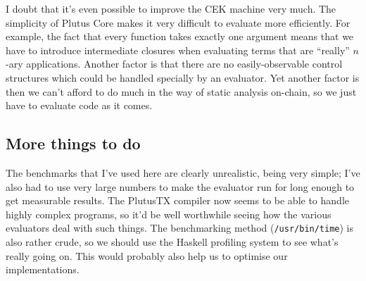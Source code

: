 \documentclass[a4paper]{article}
\begin{document}
I doubt that it's even possible to improve the CEK machine very much.
The simplicity of Plutus Core makes it very difficult to evaluate more
efficiently.  For example, the fact that every function takes exactly
one argument means that we have to introduce intermediate closures
when evaluating terms that are ``really'' $n$-ary applications.  Another
factor is that there are no easily-observable control structures which
could be handled specially by an evaluator.  Yet another factor is
then we can't afford to do much in the way of static analysis on-chain,
so we just have to evaluate code as it comes.

\subsection{More things to do}
The benchmarks that I've used here are clearly unrealistic, being very
simple; I've also had to use very large numbers to make the evaluator
run for long enough to get measurable results. The PlutusTX compiler
now seems to be able to handle highly complex programs, so it'd be
well worthwhile seeing how the various evaluators deal with such
things.  The benchmarking method (\texttt{/usr/bin/time}) is also
rather crude, so we should use the Haskell profiling system to see
what's really going on.  This would probably also help us to optimise
our implementations.




\end{document}
